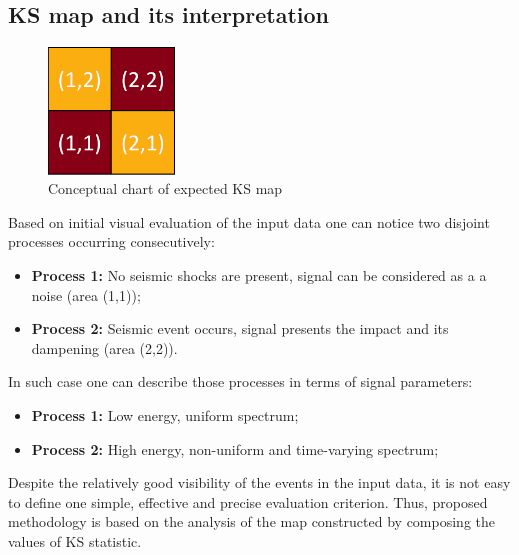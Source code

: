 \documentclass[smallextended]{svjour3}       %
\begin{document}
\subsection{KS map and its interpretation}\label{ks}

\begin{figure}[!ht]
\centering
\includegraphics[width = 0.3\textwidth]{figs/mapc}
\caption{Conceptual chart of expected KS map}
\label{fig: mapc}
\end{figure}

Based on initial visual evaluation of the input data one can notice two disjoint processes occurring consecutively:

\begin{itemize}
\item \textbf{Process 1:} No seismic shocks are present, signal can be considered as a a noise (area (1,1));
\item \textbf{Process 2:} Seismic event occurs, signal presents the impact and its dampening (area (2,2)).
\end{itemize}

In such case one can describe those processes in terms of signal parameters:

\begin{itemize}
\item \textbf{Process 1:} Low energy, uniform spectrum;
\item \textbf{Process 2:} High energy, non-uniform and time-varying spectrum;
\end{itemize}


Despite the relatively good visibility of the events in the input data, it is not easy to define one simple, effective and precise evaluation criterion. Thus, proposed methodology is based on the analysis of the map constructed by composing the values of KS statistic. 
\end{document}
